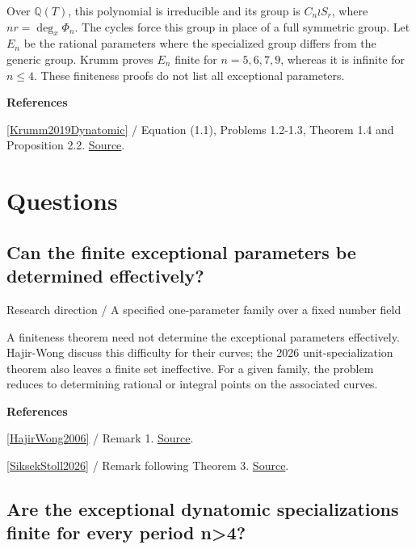 \documentclass[11pt,a4paper,oneside,openany]{book}
\newcommand{\atlasdisplay}[1]{\par\begingroup\centering\vspace{3pt}\noindent\adjustbox{max width=\linewidth}{\(\displaystyle #1\)}\par\vspace{5pt}\endgroup}
\newenvironment{sources}{\par\smallskip\begingroup\footnotesize\color{atlasgray}\leftskip=10pt\setlength{\parskip}{2pt}}{\par\endgroup\smallskip}
\begin{document}
\atlasdisplay{\Phi_n(T,x)=\prod_{d\mid n}(f_T^{\circ d}(x)-x)^{\mu(n/d)}.}
\color{black} Over \(\mathbb Q(T)\), this polynomial is irreducible and its group is \(C_n\wr S_r\), where \(nr=\deg_x\Phi_n\). The cycles force this group in place of a full symmetric group. Let \(E_n\) be the rational parameters where the specialized group differs from the generic group. Krumm proves \(E_n\) finite for \(n=5,6,7,9\), whereas it is infinite for \(n\le4\). These finiteness proofs do not list all exceptional parameters.\par
\begin{sources}
\textbf{References}\par\smallskip
\noindent\hyperlink{ref:Krumm2019Dynatomic}{[Krumm2019Dynatomic]} / Equation (1.1), Problems 1.2-1.3, Theorem 1.4 and Proposition 2.2.  \href{https://doi.org/10.2140/ant.2019.13.963}{Source}.\par
\end{sources}\color{black}
\section*{Questions}
\subsection*{Can the finite exceptional parameters be determined effectively?}
{\small\sffamily\color{atlasgold}Research direction / A specified one-parameter family over a fixed number field}\par\smallskip
\color{black} A finiteness theorem need not determine the exceptional parameters effectively. Hajir-Wong discuss this difficulty for their curves; the 2026 unit-specialization theorem also leaves a finite set ineffective. For a given family, the problem reduces to determining rational or integral points on the associated curves.\par
\begin{sources}
\textbf{References}\par\smallskip
\noindent\hyperlink{ref:HajirWong2006}{[HajirWong2006]} / Remark 1.  \href{https://www.numdam.org/item/AIF_2006__56_4_1127_0/}{Source}.\par
\noindent\hyperlink{ref:SiksekStoll2026}{[SiksekStoll2026]} / Remark following Theorem 3.  \href{https://arxiv.org/abs/2609.04551v1}{Source}.\par
\end{sources}\color{black}
\subsection*{Are the exceptional dynatomic specializations finite for every period n>4?}
\end{document}
